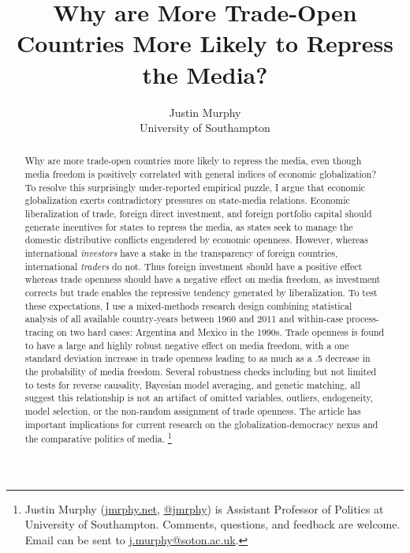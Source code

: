 \documentclass[12pt,a4paper]{article}\usepackage[]{graphicx}\usepackage[]{color}
\begin{document}
\title{Why are More Trade-Open Countries More Likely to Repress the Media?}

\author{Justin Murphy\\
University of Southampton}

\maketitle

\begin{singlespace}
\begin{abstract}
Why are more trade-open countries more likely to repress the media, even though media freedom is positively correlated with general indices of economic globalization? To resolve this surprisingly under-reported empirical puzzle, I argue that economic globalization exerts contradictory pressures on state-media relations. Economic liberalization of trade, foreign direct investment, and foreign portfolio capital should generate incentives for states to repress the media, as states seek to manage the domestic distributive conflicts engendered by economic openness. However, whereas international \emph{investors} have a stake in the transparency of foreign countries, international \emph{traders} do not. Thus foreign investment should have a positive effect whereas trade openness should have a negative effect on media freedom, as investment corrects but trade enables the repressive tendency generated by liberalization. To test these expectations, I use a mixed-methods research design combining statistical analysis of all available country-years between 1960 and 2011 and within-case process-tracing on two hard cases: Argentina and Mexico in the 1990s. Trade openness is found to have a large and highly robust negative effect on media freedom, with a one standard deviation increase in trade openness leading to as much as a .5 decrease in the probability of media freedom. Several robustness checks including but not limited to tests for reverse causality, Bayesian model averaging, and genetic matching, all suggest this relationship is not an artifact of omitted variables, outliers, endogeneity, model selection, or the non-random assignment of trade openness. The article has important implications for current research on the globalization-democracy nexus and the comparative politics of media. \footnote{Justin Murphy (\href{http://jmrphy.net}{jmrphy.net}, \href{http://twitter.com/jmrphy}{@jmrphy}) is Assistant Professor of Politics at University of Southampton. Comments, questions, and feedback are welcome. Email can be sent to \href{mailto:j.murphy@soton.ac.uk}{j.murphy@soton.ac.uk}.}

\end{abstract}
\end{singlespace}
\end{document}
